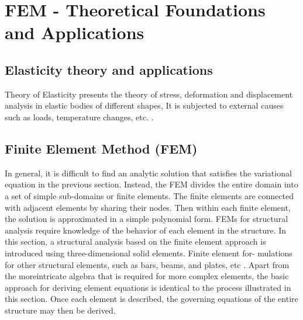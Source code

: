 \chapter{ FEM - Theoretical Foundations and Applications } %

\label{Chapter2 } %


\section{Elasticity theory and applications \parencite{ref5}}
Theory of Elasticity presents the theory of stress, deformation and displacement analysis in elastic bodies of different shapes, It is subjected to external causes such as loads, temperature changes, etc. .

\section{Finite Element Method (FEM) \parencite{ref4}}
In general, it is difficult to find an analytic solution that satisfies the variational
equation in the previous section. Instead, the FEM divides the entire domain into a
set of simple sub-domains or finite elements. The finite elements are connected with
adjacent elements by sharing their nodes. Then within each finite element, the
solution is approximated in a simple polynomial form.
\vspace{0.38cm}
\newline
FEMs for structural analysis require knowledge of the behavior of each element
in the structure. In this section, a structural analysis based on the finite element
approach is introduced using three-dimensional solid elements. Finite element for-
mulations for other structural elements, such as bars, beams, and plates, etc . Apart from the moreintricate algebra that is required for more complex elements, the basic approach for
deriving element equations is identical to the process illustrated in this section.
Once each element is described, the governing equations of the entire structure may
then be derived.

